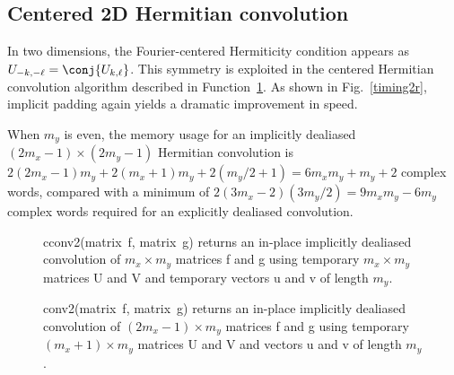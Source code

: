 \documentclass[final]{siamltex}
\begin{document}
\subsection{Centered 2D Hermitian convolution}

In two dimensions, the Fourier-centered Hermiticity condition appears as
$U_{-k,-\ell}=\conj{U_{k,\ell}}$. 
This symmetry is exploited in the centered Hermitian convolution
algorithm described in Function~\ref{conv2}. As shown in
Fig.~\ref{timing2r}, implicit padding again yields a dramatic improvement
in speed.

When $m_y$ is even, the memory usage for an implicitly dealiased
$(2m_x-1)\times (2m_y-1)$ Hermitian convolution is
$2(2m_x-1)m_y+2(m_x+1)m_y+2(m_y/2+1)=6m_xm_y+m_y+2$ complex words, compared
with a minimum of $2(3m_x-2)(3m_y/2)=9m_xm_y-6m_y$ complex words required
for an explicitly dealiased convolution.

\begin{figure}[htbp]
\begin{minipage}{0.5\linewidth}
\begin{function}[H]
  \Return \xf\;
\caption{cconv2(matrix~{\sf f}, matrix~{\sf g}) 
returns an in-place implicitly dealiased convolution of
$m_x\times m_y$ matrices {\sf f} and {\sf g} using temporary $m_x\times m_y$
matrices {\sf U} and {\sf V} and temporary vectors {\sf u} and {\sf v} of
length $m_y$.}\label{cconv2}
\end{function}
\end{minipage}
%
\begin{minipage}{0.5\linewidth}
\begin{function}[H]
  \Return \xf\;
\caption{conv2(matrix~{\sf f}, matrix~{\sf g}) 
returns an in-place implicitly dealiased convolution of $(2m_x-1)\times
m_y$ matrices {\sf f} and {\sf g} using temporary $(m_x+1)\times m_y$ matrices 
{\sf U} and {\sf V} and vectors {\sf u} and {\sf v} of length $m_y$.
}\label{conv2}
\end{function}
\end{minipage}
\end{figure}
\end{document}

